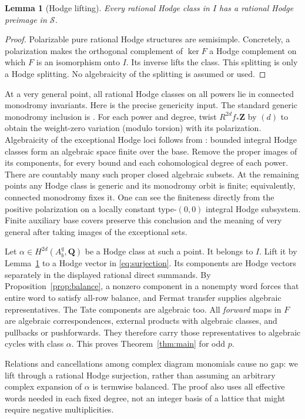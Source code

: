 \documentclass[11pt]{article}
\newtheorem{lemma}[theorem]{Lemma}
\theoremstyle{definition}
\newcommand{\Q}{\mathbf Q}
\newcommand{\Z}{\mathbf Z}
\begin{document}
\begin{lemma}[Hodge lifting]\label{lem:lift}
Every rational Hodge class in $I$ has a rational Hodge preimage in
$\mathcal S$.
\end{lemma}
\begin{proof}
Polarizable pure rational Hodge structures are semisimple. Concretely, a
polarization makes the orthogonal complement of $\ker F$ a Hodge
complement on which $F$ is an isomorphism onto $I$. Its inverse lifts the
class. This splitting is only a Hodge splitting. No algebraicity of the
splitting is assumed or used.
\end{proof}

At a very general point, all rational Hodge classes on all powers lie in
connected monodromy invariants. Here is the precise genericity input.
The standard generic monodromy inclusion is \cite[Section~4, Lemma~4]{Andre}.
For each power and degree, twist $R^{2d}f_*\Z$ by $(d)$ to obtain the
weight-zero variation (modulo torsion) with its polarization.
Algebraicity of the exceptional Hodge loci follows from
\cite[Theorem~1.1 and Corollary~1.2]{CDK}: bounded integral Hodge classes
form an algebraic space finite over the base. Remove the proper images of
its components, for every bound and each cohomological degree of each
power. There are countably many such proper closed algebraic subsets.
At the remaining points any Hodge class is generic and its monodromy orbit
is finite; equivalently, connected monodromy fixes it. One can see the
finiteness directly from the positive polarization on a locally constant
type-$(0,0)$ integral Hodge subsystem. Finite auxiliary base covers preserve
this conclusion and the meaning of very general after taking images of
the exceptional sets.

Let $\alpha\in H^{2d}(A_b^q,\Q)$ be a Hodge class at such a point.
It belongs to $I$. Lift it by Lemma~\ref{lem:lift} to a Hodge vector in
\eqref{eq:surjection}. Its components are Hodge vectors separately in
the displayed rational direct summands. By Proposition~\ref{prop:balance},
a nonzero component in a nonempty word forces that entire word to satisfy
all-row balance, and Fermat transfer supplies algebraic representatives. The Tate
components are algebraic too. All \emph{forward} maps in $F$ are
algebraic correspondences, external products with algebraic classes, and
pullbacks or pushforwards. They therefore carry those representatives to
algebraic cycles with class $\alpha$. This proves
Theorem~\ref{thm:main} for odd $p$.

Relations and cancellations among complex diagram monomials cause no gap:
we lift through a rational Hodge surjection, rather than assuming an
arbitrary complex expansion of $\alpha$ is termwise balanced. The proof
also uses all effective words needed in each fixed degree, not an integer
basis of a lattice that might require negative multiplicities.
\end{document}
